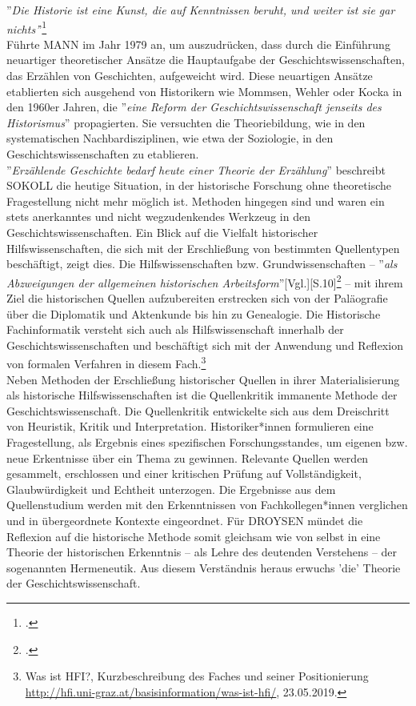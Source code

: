 \documentclass[12pt,a4paper]{article}
\begin{document}
''\textit{Die Historie ist eine Kunst, die auf Kenntnissen beruht, und weiter ist sie gar nichts'}'\footcite[TODO Seitenanzahl und .In][S.40--56]{mann1979pladoyer}
\\
Führte MANN im Jahr 1979 an, um auszudrücken, dass durch die Einführung neuartiger theoretischer Ansätze die Hauptaufgabe der Geschichtswissenschaften, das Erzählen von Geschichten, aufgeweicht wird. Diese neuartigen Ansätze etablierten sich ausgehend von Historikern wie Mommsen, Wehler oder Kocka in den 1960er Jahren, die ''\textit{eine Reform der Geschichtswissenschaft jenseits des Historismus}'' propagierten. Sie versuchten die Theoriebildung, wie in den systematischen Nachbardisziplinen, wie etwa der Soziologie, in den Geschichtswissenschaften zu etablieren.
\\
''\textit{Erzählende Geschichte bedarf heute einer Theorie der Erzählung}'' beschreibt SOKOLL die heutige Situation, in der historische Forschung ohne theoretische Fragestellung nicht mehr möglich ist. Methoden hingegen sind und waren ein stets anerkanntes und nicht wegzudenkendes Werkzeug in den Geschichtswissenschaften. Ein Blick auf die Vielfalt historischer Hilfswissenschaften, die sich mit der Erschließung von bestimmten Quellentypen beschäftigt, zeigt dies. Die Hilfswissenschaften bzw. Grundwissenschaften -- ''\textit{als Abzweigungen der allgemeinen historischen Arbeitsform}''[Vgl.][S.10]\footcite{von2007werkzeug} -- mit ihrem Ziel die historischen Quellen aufzubereiten erstrecken sich von der Paläografie über die Diplomatik und Aktenkunde bis hin zu Genealogie. Die Historische Fachinformatik versteht sich auch als Hilfswissenschaft innerhalb der Geschichtswissenschaften und beschäftigt sich mit der Anwendung und Reflexion von formalen Verfahren in diesem Fach.\footnote{Was ist HFI?, Kurzbeschreibung des Faches und seiner Positionierung \protect\url{http://hfi.uni-graz.at/basisinformation/was-ist-hfi/}, 23.05.2019.} 
\\
Neben Methoden der Erschließung historischer Quellen in ihrer Materialisierung als historische Hilfswissenschaften ist die Quellenkritik immanente Methode der Geschichtswissenschaft. Die Quellenkritik entwickelte sich aus dem Dreischritt von Heuristik, Kritik und Interpretation. Historiker*innen formulieren eine Fragestellung, als Ergebnis eines spezifischen Forschungsstandes, um eigenen bzw. neue  Erkentnisse über ein Thema zu gewinnen. Relevante Quellen werden gesammelt, erschlossen und einer kritischen Prüfung auf Vollständigkeit, Glaubwürdigkeit und Echtheit unterzogen. Die Ergebnisse aus dem Quellenstudium werden mit den Erkenntnissen von Fachkollegen*innen verglichen und in übergeordnete Kontexte eingeordnet. Für DROYSEN mündet die Reflexion auf die historische Methode somit gleichsam wie von selbst in eine Theorie der historischen Erkenntnis -- als Lehre des deutenden Verstehens -- der sogenannten Hermeneutik. Aus diesem Verständnis heraus erwuchs 'die' Theorie der Geschichtswissenschaft.
\end{document}
